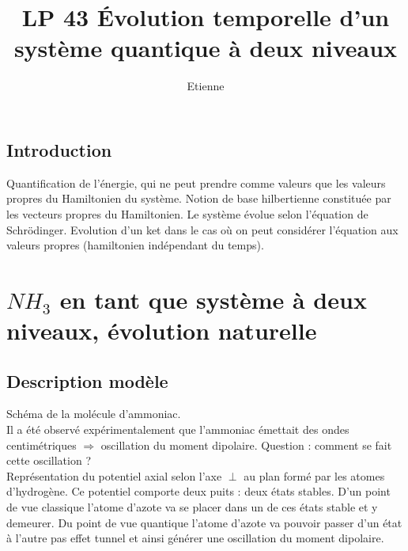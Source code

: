 \documentclass[12pt,prb,aps,epsf]{report}
\begin{document}
	
	\title{LP 43 Évolution temporelle d'un système quantique à deux niveaux}
	\author{Etienne}
	
	\maketitle
	
	\tableofcontents
	
	\pagebreak
	
\subsection{Introduction}
Quantification de l'énergie, qui ne peut prendre comme valeurs que les valeurs propres du Hamiltonien du système. Notion de base hilbertienne constituée par les vecteurs propres du Hamiltonien. Le système évolue selon l'équation de Schrödinger. Evolution d'un ket dans le cas où on peut considérer l'équation aux valeurs propres (hamiltonien indépendant du temps).

\section{$NH_3$ en tant que système à deux niveaux, évolution naturelle}
\subsection{Description modèle}
Schéma de la molécule d'ammoniac.\\  Il a été observé expérimentalement que l'ammoniac émettait des ondes centimétriques $\Rightarrow$ oscillation du moment dipolaire. Question : comment se fait cette oscillation ?\\
Représentation du potentiel axial selon l'axe $\perp$ au plan formé par les atomes d'hydrogène. Ce potentiel comporte deux puits : deux états stables. D'un point de vue classique l'atome d'azote va se placer dans un de ces états stable et y demeurer. Du point de vue quantique l'atome d'azote va pouvoir passer d'un état à l'autre pas effet tunnel et ainsi générer une oscillation du moment dipolaire.
\end{document}
